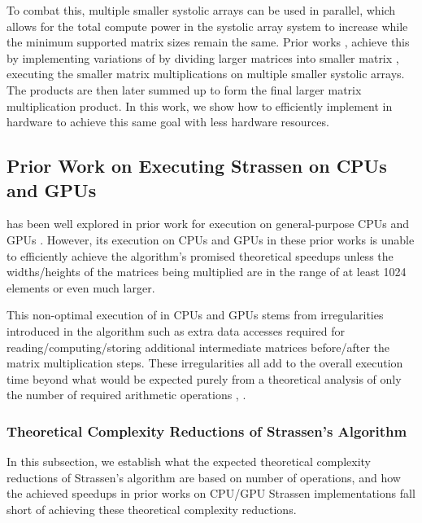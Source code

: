 To combat this, multiple smaller systolic arrays can be used in parallel, which allows for the total compute power in the systolic array system to increase while the minimum supported matrix sizes remain the same.
Prior works \cite{kung2019maestro}, \cite{yuzuguler2023Scale} achieve this by implementing variations of  by dividing larger matrices into smaller matrix \blocks, executing the smaller matrix \block multiplications on multiple smaller systolic arrays.
The \block products are then later summed up to form the final larger matrix multiplication product.
In this work, we show how to efficiently implement \seq in hardware to achieve this same goal with less hardware resources.

\subsection{Prior Work on Executing Strassen on CPUs and GPUs}
\sa has been well explored in prior work for execution on general-purpose CPUs and GPUs \citeCpu.
However, its execution on CPUs and GPUs in these prior works is unable to efficiently achieve the algorithm's promised theoretical speedups unless the widths/heights of the matrices being multiplied are in the range of at least 1024 elements or even much larger.

This non-optimal execution of \sa in CPUs and GPUs stems from irregularities introduced in the algorithm such as extra data accesses required for reading/computing/storing additional intermediate matrices before/after the matrix multiplication steps.
These irregularities all add to the overall execution time beyond what would be expected purely from a theoretical analysis of only the number of required arithmetic operations \cite{krishnan2021multi}, \cite{lipshitz2012communication}.

\subsubsection{Theoretical Complexity Reductions of Strassen's Algorithm}
\label{smm:sec:theoretical-complexity}
In this subsection, we establish what the expected theoretical complexity reductions of Strassen's algorithm are based on number of operations, and how the achieved speedups in prior works on CPU/GPU Strassen implementations fall short of achieving these theoretical complexity reductions.

